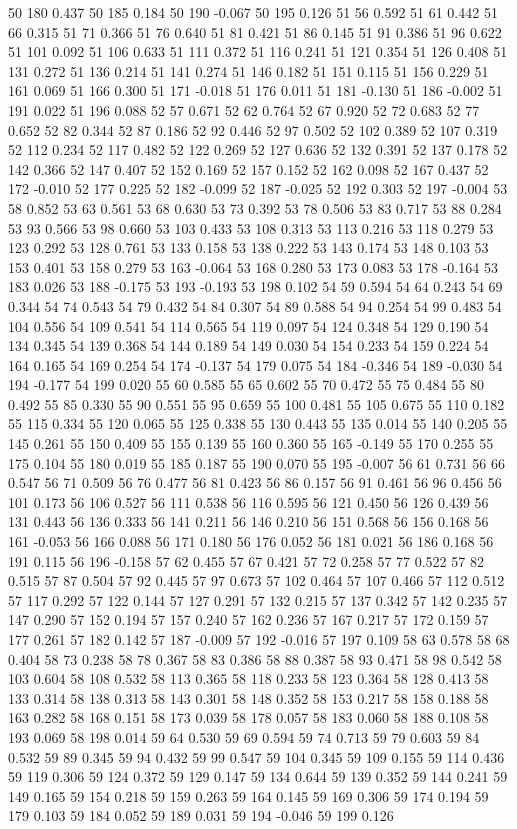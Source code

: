 50 180 0.437
50 185 0.184
50 190 -0.067
50 195 0.126
51 56 0.592
51 61 0.442
51 66 0.315
51 71 0.366
51 76 0.640
51 81 0.421
51 86 0.145
51 91 0.386
51 96 0.622
51 101 0.092
51 106 0.633
51 111 0.372
51 116 0.241
51 121 0.354
51 126 0.408
51 131 0.272
51 136 0.214
51 141 0.274
51 146 0.182
51 151 0.115
51 156 0.229
51 161 0.069
51 166 0.300
51 171 -0.018
51 176 0.011
51 181 -0.130
51 186 -0.002
51 191 0.022
51 196 0.088
52 57 0.671
52 62 0.764
52 67 0.920
52 72 0.683
52 77 0.652
52 82 0.344
52 87 0.186
52 92 0.446
52 97 0.502
52 102 0.389
52 107 0.319
52 112 0.234
52 117 0.482
52 122 0.269
52 127 0.636
52 132 0.391
52 137 0.178
52 142 0.366
52 147 0.407
52 152 0.169
52 157 0.152
52 162 0.098
52 167 0.437
52 172 -0.010
52 177 0.225
52 182 -0.099
52 187 -0.025
52 192 0.303
52 197 -0.004
53 58 0.852
53 63 0.561
53 68 0.630
53 73 0.392
53 78 0.506
53 83 0.717
53 88 0.284
53 93 0.566
53 98 0.660
53 103 0.433
53 108 0.313
53 113 0.216
53 118 0.279
53 123 0.292
53 128 0.761
53 133 0.158
53 138 0.222
53 143 0.174
53 148 0.103
53 153 0.401
53 158 0.279
53 163 -0.064
53 168 0.280
53 173 0.083
53 178 -0.164
53 183 0.026
53 188 -0.175
53 193 -0.193
53 198 0.102
54 59 0.594
54 64 0.243
54 69 0.344
54 74 0.543
54 79 0.432
54 84 0.307
54 89 0.588
54 94 0.254
54 99 0.483
54 104 0.556
54 109 0.541
54 114 0.565
54 119 0.097
54 124 0.348
54 129 0.190
54 134 0.345
54 139 0.368
54 144 0.189
54 149 0.030
54 154 0.233
54 159 0.224
54 164 0.165
54 169 0.254
54 174 -0.137
54 179 0.075
54 184 -0.346
54 189 -0.030
54 194 -0.177
54 199 0.020
55 60 0.585
55 65 0.602
55 70 0.472
55 75 0.484
55 80 0.492
55 85 0.330
55 90 0.551
55 95 0.659
55 100 0.481
55 105 0.675
55 110 0.182
55 115 0.334
55 120 0.065
55 125 0.338
55 130 0.443
55 135 0.014
55 140 0.205
55 145 0.261
55 150 0.409
55 155 0.139
55 160 0.360
55 165 -0.149
55 170 0.255
55 175 0.104
55 180 0.019
55 185 0.187
55 190 0.070
55 195 -0.007
56 61 0.731
56 66 0.547
56 71 0.509
56 76 0.477
56 81 0.423
56 86 0.157
56 91 0.461
56 96 0.456
56 101 0.173
56 106 0.527
56 111 0.538
56 116 0.595
56 121 0.450
56 126 0.439
56 131 0.443
56 136 0.333
56 141 0.211
56 146 0.210
56 151 0.568
56 156 0.168
56 161 -0.053
56 166 0.088
56 171 0.180
56 176 0.052
56 181 0.021
56 186 0.168
56 191 0.115
56 196 -0.158
57 62 0.455
57 67 0.421
57 72 0.258
57 77 0.522
57 82 0.515
57 87 0.504
57 92 0.445
57 97 0.673
57 102 0.464
57 107 0.466
57 112 0.512
57 117 0.292
57 122 0.144
57 127 0.291
57 132 0.215
57 137 0.342
57 142 0.235
57 147 0.290
57 152 0.194
57 157 0.240
57 162 0.236
57 167 0.217
57 172 0.159
57 177 0.261
57 182 0.142
57 187 -0.009
57 192 -0.016
57 197 0.109
58 63 0.578
58 68 0.404
58 73 0.238
58 78 0.367
58 83 0.386
58 88 0.387
58 93 0.471
58 98 0.542
58 103 0.604
58 108 0.532
58 113 0.365
58 118 0.233
58 123 0.364
58 128 0.413
58 133 0.314
58 138 0.313
58 143 0.301
58 148 0.352
58 153 0.217
58 158 0.188
58 163 0.282
58 168 0.151
58 173 0.039
58 178 0.057
58 183 0.060
58 188 0.108
58 193 0.069
58 198 0.014
59 64 0.530
59 69 0.594
59 74 0.713
59 79 0.603
59 84 0.532
59 89 0.345
59 94 0.432
59 99 0.547
59 104 0.345
59 109 0.155
59 114 0.436
59 119 0.306
59 124 0.372
59 129 0.147
59 134 0.644
59 139 0.352
59 144 0.241
59 149 0.165
59 154 0.218
59 159 0.263
59 164 0.145
59 169 0.306
59 174 0.194
59 179 0.103
59 184 0.052
59 189 0.031
59 194 -0.046
59 199 0.126
